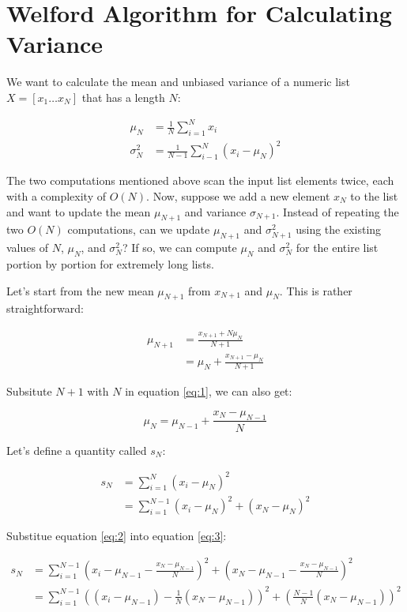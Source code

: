 \section{Welford Algorithm for Calculating Variance}

We want to calculate the mean and unbiased variance of a numeric list $X=[x_1 \ldots x_{N}]$ that has a length $N$:

\begin{align*}
\mu_{N} &= \frac{1}{N}\sum^{N}_{i=1} x_i \\
\sigma^2_{N} &=\frac{1}{N-1} \sum^{N}_{i-1}\left(x_i - \mu_{N}\right)^2 
\end{align*}

The two computations mentioned above scan the input list elements twice, each with a complexity of $O(N)$. Now, suppose we add a new element $x_{N}$ to the list and want to update the mean $\mu_{N+1}$ and variance $\sigma_{N+1}$. Instead of repeating the two $O(N)$ computations, can we update $\mu_{N+1}$ and $\sigma_{N+1}^2$ using the existing values of $N$, $\mu_{N}$, and $\sigma_{N}^2$? If so, we can compute $\mu_N$ and $\sigma_{N}^2$ for the entire list portion by portion for extremely long lists.

Let's start from the new mean $\mu_{N+1}$ from $x_{N+1}$ and $\mu_{N}$. This is rather straightforward:

\begin{align}
\mu_{N+1} &= \frac{x_{N+1}+N\mu_{N}}{N+1} \nonumber \\
&=\mu_{N}+\frac{x_{N+1}-\mu_{N}}{N+1}\tag{1}\label{eq:1}
\end{align}

Subsitute $N+1$ with $N$ in equation \eqref{eq:1}, we can also get:

\begin{equation}
\mu_{N}=\mu_{N-1}+\frac{x_{N}-\mu_{N-1}}{N}\tag{2}\label{eq:2}
\end{equation}


Let's define a quantity called $s_N$:

\begin{align*}
s_{N} &= \sum^{N}_{i=1}(x_i - \mu_{N})^2 \\
&=\sum^{N-1}_{i=1}\left(x_i-\mu_{N}\right)^2+\left(x_N-\mu_{N}\right)^2 \tag{3}\label{eq:3}
\end{align*}

Substitue equation \eqref{eq:2} into equation \eqref{eq:3}:

\begin{align*}
s_N &= \sum_{i=1}^{N-1}\left(x_i-\mu_{N-1}-\frac{x_N-\mu_{N-1}}{N} \right)^2 + \left(x_N-\mu_{N-1}-\frac{x_N-\mu_{N-1}}{N}\right)^2 \\
&=\sum_{i=1}^{N-1}\left(\left(x_i-\mu_{N-1}\right)-\frac{1}{N}\left(x_N-\mu_{N-1}\right)\right)^2+\left(\frac{N-1}{N}(x_N-\mu_{N-1})\right)^2 \tag{4}\label{eq:4}
\end{align*}

